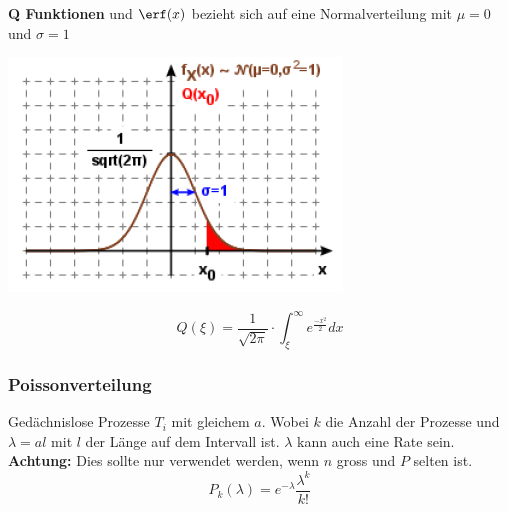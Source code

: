 \textbf{Q Funktionen}  und 
$\erf(x)$ bezieht sich auf eine Normalverteilung mit $\mu = 0$ und $\sigma = 1$\\
\begin{minipage}{0.20\textwidth}
	\includegraphics[width=\columnwidth]{Images/q}
\end{minipage}%
\begin{minipage}{0.30\textwidth}
	\[
	Q(\xi) = \frac{1}{\sqrt{2\pi}}\cdot\int_{\xi}^{\infty}e^{\frac{-x^2}{2}}dx
	\]
\end{minipage}

\subsubsection{Poissonverteilung}
Gedächnislose Prozesse $T_i$ mit gleichem $a$. Wobei $k$ die Anzahl der Prozesse und $\lambda = al$ mit $l$ der Länge auf dem Intervall ist. $\lambda$ kann auch eine Rate sein. \textbf{Achtung:} Dies sollte nur verwendet werden, wenn $n$ gross und $P$ selten ist.
\[
P_k(\lambda) = e^{-\lambda}\frac{\lambda^k}{k!}
\]
